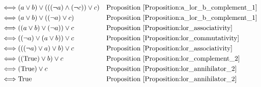 \begin{prop}
\begin{align*}
\iff & (a \lor b) \lor (((\lnot a) \land (\lnot c)) \lor c)
& & \text{Proposition \ref{Proposition:a_lor_b_complement_1}} \\
\iff & (a \lor b) \lor ((\lnot a) \lor c)
& & \text{Proposition \ref{Proposition:a_lor_b_complement_1}} \\
\iff & ((a \lor b) \lor (\lnot a)) \lor c
& & \text{Proposition \ref{Proposition:lor_associativity}} \\
\iff & ((\lnot a) \lor (a \lor b)) \lor c
& & \text{Proposition \ref{Proposition:lor_commutativity}} \\
\iff & (((\lnot a) \lor a) \lor b) \lor c
& & \text{Proposition \ref{Proposition:lor_associativity}} \\
\iff & ((\text{True}) \lor b) \lor c
& & \text{Proposition \ref{Proposition:lor_complement_2}} \\
\iff & (\text{True}) \lor c
& & \text{Proposition \ref{Proposition:lor_annihilator_2}} \\
\iff & \text{True}
& & \text{Proposition \ref{Proposition:lor_annihilator_2}} \\
\end{align*}
\end{prop}

